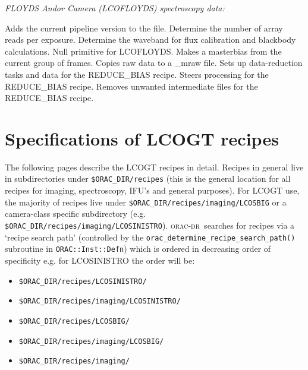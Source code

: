 \documentclass[twoside,11pt,nolof]{starlink}
\providecommand{\oracdr}{\textsc{orac-dr}}
\providecommand{\task}[1]{\textsf{#1}}
\begin{document}
\begin{small}
{\large
\begin{center}
{\it FLOYDS Andor Camera (LCOFLOYDS) spectroscopy data:}
\end{center}
}

\begin{description}
Adds the current pipeline version to the file.
Determine the number of array reads per exposure.
Determine the waveband for flux calibration and blackbody calculations.
Null primitive for \textsc{LCOFLOYDS}.
Makes a masterbias from the current group of frames.
Copies raw data to a \_mraw file.
Sets up data-reduction tasks and data for the \task{REDUCE\_BIAS} recipe.
Steers processing for the \task{REDUCE\_BIAS} recipe.
Removes unwanted intermediate files for the \task{REDUCE\_BIAS} recipe.
\end{description}


\end{small}

\newpage

\section{Specifications of LCOGT recipes\label{ap:full_recipes}}

The following pages describe the LCOGT recipes in detail. Recipes in
general live in subdirectories under \verb+$ORAC_DIR/recipes+ (this is the
general location for all recipes for imaging, spectroscopy, IFU's and general
purposes). For LCOGT use, the majority of recipes live under
\verb+$ORAC_DIR/recipes/imaging/LCOSBIG+ or a camera-class specific
subdirectory (e.g. \verb+$ORAC_DIR/recipes/imaging/LCOSINISTRO+). \oracdr\ 
searches for recipes via a `recipe search path' (controlled by the
\verb+orac_determine_recipe_search_path()+ subroutine in
\verb+ORAC::Inst::Defn+) which is ordered in
decreasing order of specificity e.g. for \textsc{LCOSINISTRO} the order will be:
\begin{itemize}
\item \verb+$ORAC_DIR/recipes/LCOSINISTRO/+
\item \verb+$ORAC_DIR/recipes/imaging/LCOSINISTRO/+
\item \verb+$ORAC_DIR/recipes/LCOSBIG/+
\item \verb+$ORAC_DIR/recipes/imaging/LCOSBIG/+
\item \verb+$ORAC_DIR/recipes/imaging/+
\end{itemize}
\end{document}
